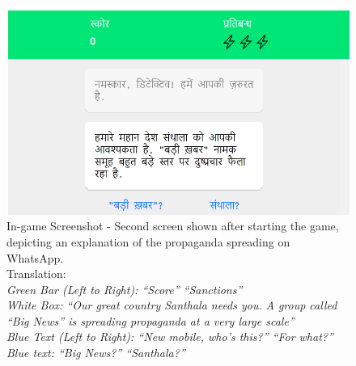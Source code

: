 \documentclass[empirical, authordate]{jote-new-article}
\begin{document}
\begin{figure}

  \includegraphics[width=\linewidth]{media/supplement/images5.jpeg}

  \caption{In-game Screenshot - Second screen shown after starting the game, depicting an explanation of the propaganda spreading on \mbox{WhatsApp}.\\ Translation: \\
    \emph{Green Bar (Left to Right): “Score” “Sanctions”} \\
    \emph{White Box: “Our great country Santhala needs you. }\emph{A group called “Big News” is spreading propaganda at a very large scale”} \\
    \emph{Blue Text (Left to Right): “New mobile, who's this?” “For what?”} \\
    \emph{Blue text: “Big News?” “Santhala?”}
  }

  \label{}


\end{figure}
\end{document}
